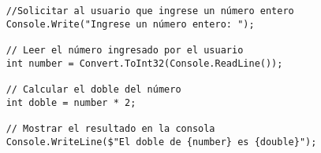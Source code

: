 \begin{lstlisting}
    //Solicitar al usuario que ingrese un número entero
    Console.Write("Ingrese un número entero: ");
        
    // Leer el número ingresado por el usuario
    int number = Convert.ToInt32(Console.ReadLine());
        
    // Calcular el doble del número
    int doble = number * 2;
        
    // Mostrar el resultado en la consola
    Console.WriteLine($"El doble de {number} es {double}");
\end{lstlisting}
